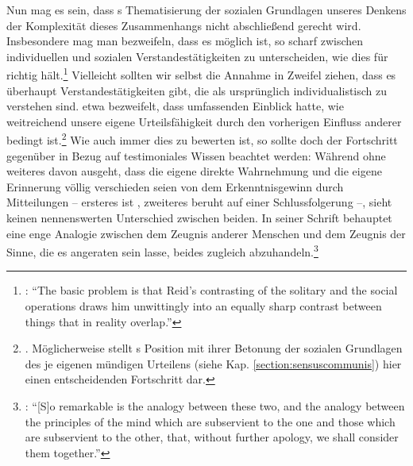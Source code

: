 Nun mag es sein, dass s Thematisierung der sozialen Grundlagen
unseres Denkens der Komplexität dieses Zusammenhangs nicht abschließend gerecht
wird. Insbesondere mag man
bezweifeln, dass es möglich ist, so scharf zwischen individuellen und sozialen
Verstandestätigkeiten zu unterscheiden, wie  dies für richtig
hält.\footnote{\cite[Vgl.][197]{Coady:ReidandtheSocialOperationsofMind2004}:
\enquote{The basic problem is that Reid’s contrasting of the solitary and the social
operations draws him unwittingly into an equally sharp contrast between things
that in reality overlap.}} Vielleicht sollten wir selbst die Annahme in Zweifel
ziehen, dass es überhaupt Verstandestätigkeiten gibt, die als ursprünglich
individualistisch zu verstehen sind.  etwa
bezweifelt, dass  umfassenden Einblick hatte, wie weitreichend unsere
eigene Urteilsfähigkeit durch den vorherigen Einfluss anderer bedingt
ist.\footnote{\cite[Vgl.][197--201]{Coady:ReidandtheSocialOperationsofMind2004}.
Möglicherweise stellt s Position mit ihrer Betonung der
sozialen Grundlagen des je eigenen mündigen Urteilens (siehe Kap.
\ref{section:sensuscommunis}) hier einen entscheidenden Fortschritt dar.} Wie
auch immer dies zu bewerten ist, so sollte doch der Fortschritt gegenüber
 in Bezug auf
testimoniales Wissen beachtet werden: Während
 ohne weiteres davon
ausgeht, dass die eigene direkte Wahrnehmung und die eigene Erinnerung völlig
verschieden seien von dem Erkenntnisgewinn durch Mitteilungen -- ersteres ist
, zweiteres beruht auf einer Schlussfolgerung --, sieht
 keinen nennenswerten
Unterschied zwischen beiden. In seiner Schrift
behauptet  eine enge Analogie zwischen dem Zeugnis anderer Menschen
und dem Zeugnis der Sinne, die es angeraten sein lasse, beides zugleich
abzuhandeln.\footnote{\cite[Vgl.][190]{Reid:AnInquiryIntotheHumanMindonthePrinciplesofCommonSense1997}:
\enquote{[S]o remarkable is the analogy between these two, and the analogy
between the principles of the mind which are subservient to the one and those
which are subservient to the other, that, without further apology, we shall
consider them together.}}


